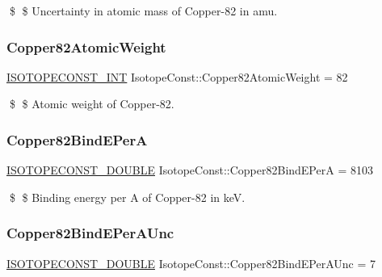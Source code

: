\$ \$ Uncertainty in atomic mass of Copper-\/82 in amu. \mbox{\label{group___isotope_const-_copper-_cu82_ga44e384572dc619518748e7ac915c2219}} 
\subsubsection{\texorpdfstring{Copper82\+Atomic\+Weight}{Copper82AtomicWeight}}
{\footnotesize\ttfamily \mbox{\hyperlink{group___isotope_const-_macros_ga5f18360b3e99483a35c32d789e62621c}{I\+S\+O\+T\+O\+P\+E\+C\+O\+N\+S\+T\+\_\+\+I\+NT}} Isotope\+Const\+::\+Copper82\+Atomic\+Weight = 82}

\$ \$ Atomic weight of Copper-\/82. \mbox{\label{group___isotope_const-_copper-_cu82_ga4760931f1dee009914f2708ebb57422e}} 
\subsubsection{\texorpdfstring{Copper82\+Bind\+E\+PerA}{Copper82BindEPerA}}
{\footnotesize\ttfamily \mbox{\hyperlink{group___isotope_const-_macros_ga8f45a7272ce02c0b4c65c44636ed719a}{I\+S\+O\+T\+O\+P\+E\+C\+O\+N\+S\+T\+\_\+\+D\+O\+U\+B\+LE}} Isotope\+Const\+::\+Copper82\+Bind\+E\+PerA = 8103}

\$ \$ Binding energy per A of Copper-\/82 in keV. \mbox{\label{group___isotope_const-_copper-_cu82_ga016c0dc5960544222d7f65b5e436cb15}} 
\subsubsection{\texorpdfstring{Copper82\+Bind\+E\+Per\+A\+Unc}{Copper82BindEPerAUnc}}
{\footnotesize\ttfamily \mbox{\hyperlink{group___isotope_const-_macros_ga8f45a7272ce02c0b4c65c44636ed719a}{I\+S\+O\+T\+O\+P\+E\+C\+O\+N\+S\+T\+\_\+\+D\+O\+U\+B\+LE}} Isotope\+Const\+::\+Copper82\+Bind\+E\+Per\+A\+Unc = 7}

